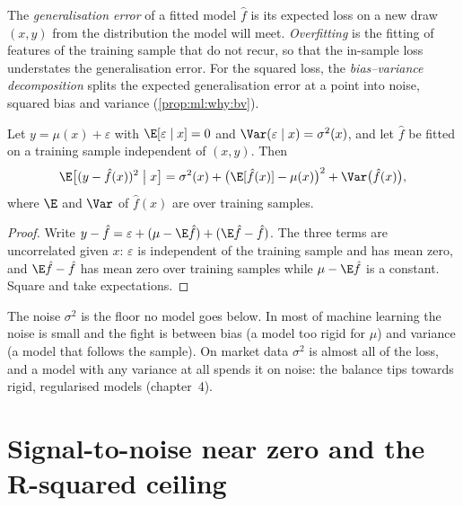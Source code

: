 \begin{definition}\label{def:ml:why-financial-machine-learning-is-different:generalisation}
The \emph{generalisation error} of a fitted model $\hat f$ is its expected loss on a new
draw $(x, y)$ from the distribution the model will meet. \emph{Overfitting} is the fitting of
features of the training sample that do not recur, so that the in-sample loss understates the generalisation error.
For the squared loss, the \emph{bias--variance decomposition} splits the expected
generalisation error at a point into noise, squared bias and variance (\cref{prop:ml:why:bv}).
\end{definition}

\begin{proposition}\label{prop:ml:why:bv}
Let $y = \mu(x) + \varepsilon$ with $\E[\varepsilon\mid x] = 0$ and $\Var(\varepsilon\mid x) = \sigma^2(x)$, and let
$\hat f$ be fitted on a training sample independent of $(x, y)$. Then
\[
\E\bigl[(y - \hat f(x))^2 \bigm| x\bigr] = \sigma^2(x) + \bigl(\E[\hat f(x)] - \mu(x)\bigr)^2 + \Var\bigl(\hat f(x)\bigr),
\]
where $\E$ and $\Var$ of $\hat f(x)$ are over training samples.
\end{proposition}

\begin{proof}
Write $y - \hat f = \varepsilon + (\mu - \E\hat f) + (\E\hat f - \hat f)$. The three terms are uncorrelated given $x$:
$\varepsilon$ is independent of the training sample and has mean zero, and $\E\hat f - \hat f$ has mean zero over
training samples while $\mu - \E\hat f$ is a constant. Square and take expectations.
\end{proof}

The noise $\sigma^2$ is the floor no model goes below. In most of machine learning the noise is small and the fight is
between bias (a model too rigid for $\mu$) and variance (a model that follows the sample). On market data $\sigma^2$ is
almost all of the loss, and a model with any variance at all spends it on noise: the balance tips towards rigid,
regularised models (chapter~4).

\section{Signal-to-noise near zero and the R-squared ceiling}

